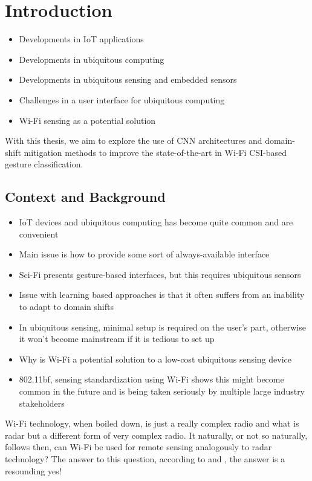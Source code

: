 \chapter{Introduction}\label{chapter:introduction}


\begin{itemize}
	\item Developments in IoT applications
	\item Developments in ubiquitous computing
	\item Developments in ubiquitous sensing and embedded sensors
	\item Challenges in a user interface for ubiquitous computing
	\item Wi-Fi sensing as a potential solution
\end{itemize}

With this thesis, we aim to explore the use of CNN architectures and domain-shift mitigation methods to improve the state-of-the-art in Wi-Fi CSI-based gesture classification.

\section{Context and Background}\label{sec:intro-context}

\begin{itemize}
	\item IoT devices and ubiquitous computing has become quite common and are convenient
	\item Main issue is how to provide some sort of always-available interface
	\item Sci-Fi presents gesture-based interfaces, but this requires ubiquitous sensors
	\item Issue with learning based approaches is that it often suffers from an inability to adapt to domain shifts
	\item In ubiquitous sensing, minimal setup is required on the user's part, otherwise it won't become mainstream if it is tedious to set up
	\item Why is Wi-Fi a potential solution to a low-cost ubiquitous sensing device
	\item 802.11bf, sensing standardization using Wi-Fi shows this might become common in the future and is being taken seriously by multiple large industry stakeholders
\end{itemize}

Wi-Fi technology, when boiled down, is just a really complex radio and what is radar but a different form of very complex radio.
It naturally, or not so naturally, follows then, can Wi-Fi be used for remote sensing analogously to radar technology?
The answer to this question, according to \cite{adib2013see} and \cite{chetty2011through}, the answer is a resounding yes!

